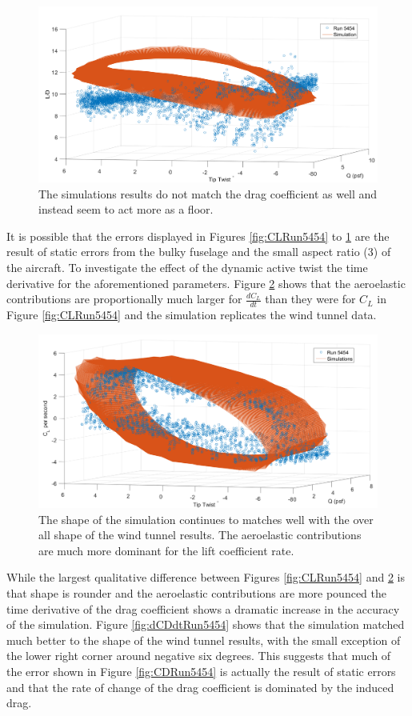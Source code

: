\documentclass[11pt]{ucthesis}
\begin{document}
\begin{figure}[thpb]
\centering
\includegraphics[width=.75\linewidth]{Figures/LD5454.png}
\caption{The simulations results do not match the drag coefficient as well and instead seem to act more as a floor.}
\label{fig:LDRun5454}
\end{figure}

It is possible that the errors displayed in Figures \ref{fig:CLRun5454} to \ref{fig:LDRun5454} are the result of static errors from the bulky fuselage and the small aspect ratio (3) of the aircraft. To investigate the effect of the dynamic active twist the time derivative for the aforementioned parameters. Figure \ref{fig:dCLdtRun5454} shows that the aeroelastic contributions are proportionally much larger for $\frac{dC_L}{dt}$ than they were for $C_L$ in Figure \ref{fig:CLRun5454} and the simulation replicates the wind tunnel data.

\begin{figure}[thpb]
\centering
\includegraphics[width=.75\linewidth]{Figures/diffCL5454.png}
\caption{The shape of the simulation continues to matches well with the over all shape of the wind tunnel results. The aeroelastic contributions are much more dominant for the lift coefficient rate.}
\label{fig:dCLdtRun5454}
\end{figure}

While the largest qualitative difference between Figures \ref{fig:CLRun5454} and \ref{fig:dCLdtRun5454} is that shape is rounder and the aeroelastic contributions are more pounced the time derivative of the drag coefficient shows a dramatic increase in the accuracy of the simulation. Figure \ref{fig:dCDdtRun5454} shows that the simulation matched much better to the shape of the wind tunnel results, with the small exception of the lower right corner around negative six degrees. This suggests that much of the error shown in Figure \ref{fig:CDRun5454} is actually the result of static errors and that the rate of change of the drag coefficient is dominated by the induced drag.
\end{document}
